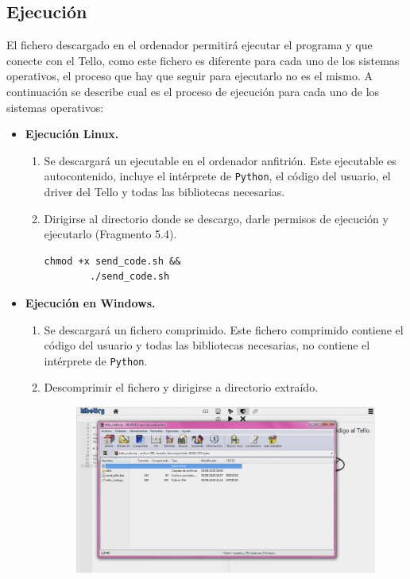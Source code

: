 \documentclass{report}
\begin{document}
\subsection{Ejecución}


El fichero descargado en el ordenador permitirá ejecutar el programa y que conecte con el Tello, como este fichero es diferente para cada uno de los sistemas operativos, el proceso que hay que seguir para ejecutarlo no es el mismo. A continuación se describe cual es el proceso de ejecución para cada uno de los sistemas operativos:
\begin{itemize}
	\item \textbf{Ejecución Linux.} 
		\begin{enumerate}
			\item Se descargará un ejecutable en el ordenador anfitrión. Este ejecutable es autocontenido, incluye el intérprete de \texttt{Python}, el código del usuario, el driver del Tello y todas las bibliotecas necesarias.
			\item Dirigirse al directorio donde se descargo, darle permisos de ejecución y ejecutarlo (Fragmento 5.4).
			\\
			\begin{lstlisting}[frame=single,breaklines=true, label=Comandos para ejecución del envío en MacOS, caption=Comandos para ejecución del envío en MacOS,  captionpos=b]
		chmod +x send_code.sh &&
		./send_code.sh
			\end{lstlisting}
		\end{enumerate}
	\item \textbf{Ejecución en Windows.} 
		\begin{enumerate}
			\item Se descargará un fichero comprimido. Este fichero comprimido contiene el código del usuario y todas las bibliotecas necesarias, no contiene el intérprete de \texttt{Python}.
			\item Descomprimir el fichero y dirigirse a  directorio extraído.
			\\
			\begin{figure}[h!]
 			 	\centering
    				\includegraphics[width=1\textwidth]{images/descarga_windows_tello.png}

\end{figure}
\end{enumerate}
\end{itemize}
\end{document}
